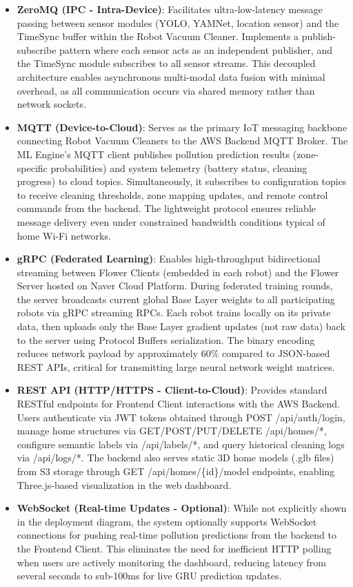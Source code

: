 \documentclass[conference]{IEEEtran}
\begin{document}
\begin{itemize}
    \item \textbf{ZeroMQ (IPC - Intra-Device)}: Facilitates ultra-low-latency message passing between sensor modules (YOLO, YAMNet, location sensor) and the TimeSync buffer within the Robot Vacuum Cleaner. Implements a publish-subscribe pattern where each sensor acts as an independent publisher, and the TimeSync module subscribes to all sensor streams. This decoupled architecture enables asynchronous multi-modal data fusion with minimal overhead, as all communication occurs via shared memory rather than network sockets.

    \item \textbf{MQTT (Device-to-Cloud)}: Serves as the primary IoT messaging backbone connecting Robot Vacuum Cleaners to the AWS Backend MQTT Broker. The ML Engine's MQTT client publishes pollution prediction results (zone-specific probabilities) and system telemetry (battery status, cleaning progress) to cloud topics. Simultaneously, it subscribes to configuration topics to receive cleaning thresholds, zone mapping updates, and remote control commands from the backend. The lightweight protocol ensures reliable message delivery even under constrained bandwidth conditions typical of home Wi-Fi networks.

    \item \textbf{gRPC (Federated Learning)}: Enables high-throughput bidirectional streaming between Flower Clients (embedded in each robot) and the Flower Server hosted on Naver Cloud Platform. During federated training rounds, the server broadcasts current global Base Layer weights to all participating robots via gRPC streaming RPCs. Each robot trains locally on its private data, then uploads only the Base Layer gradient updates (not raw data) back to the server using Protocol Buffers serialization. The binary encoding reduces network payload by approximately 60\% compared to JSON-based REST APIs, critical for transmitting large neural network weight matrices.

    \item \textbf{REST API (HTTP/HTTPS - Client-to-Cloud)}: Provides standard RESTful endpoints for Frontend Client interactions with the AWS Backend. Users authenticate via JWT tokens obtained through POST /api/auth/login, manage home structures via GET/POST/PUT/DELETE /api/homes/*, configure semantic labels via /api/labels/*, and query historical cleaning logs via /api/logs/*. The backend also serves static 3D home models (.glb files) from S3 storage through GET /api/homes/\{id\}/model endpoints, enabling Three.js-based visualization in the web dashboard.

    \item \textbf{WebSocket (Real-time Updates - Optional)}: While not explicitly shown in the deployment diagram, the system optionally supports WebSocket connections for pushing real-time pollution predictions from the backend to the Frontend Client. This eliminates the need for inefficient HTTP polling when users are actively monitoring the dashboard, reducing latency from several seconds to sub-100ms for live GRU prediction updates.
\end{itemize}
\end{document}
